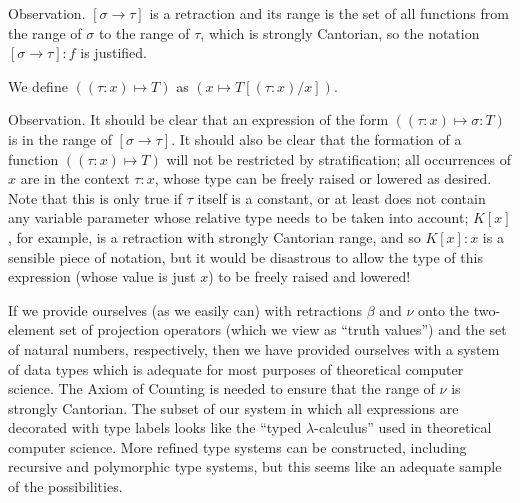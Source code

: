 \begin{ThmEtc}{Observation.}
 $[\sigma \rightarrow \tau]$ is a retraction and
 its range is the set of all functions from the range of
 $\sigma$ to the range of $\tau$, which is strongly Cantorian, so the notation
 $[\sigma \rightarrow \tau]: f$ is justified.
\end{ThmEtc}

\begin{definition}
 We define $((\tau:x) \mapsto T)$ as $(x
 \mapsto T[(\tau:x)/x])$.  
\end{definition}

\begin{ThmEtc}{Observation.}
 It should be clear that an expression of the form $((\tau
 : x) \mapsto \sigma : T)$ is in the range of $[\sigma \rightarrow
 \tau]$.  It should also be clear that the formation of a function
 $((\tau:x) \mapsto T)$ will not be restricted by
 stratification; all 
 occurrences of $x$ are in the context $\tau:x$, whose type can be 
 freely raised or lowered as desired.  Note that this is only true if
 $\tau$ itself is a constant, or at least does not contain any variable
 parameter whose relative type needs to be taken into account; $K[x]$,
 for example, is a retraction with strongly Cantorian range, and so 
 $K[x]:x$ is a sensible piece of notation, but it would be disastrous
 to allow the type of this expression (whose value is just $x$) to be freely
 raised and lowered!
\end{ThmEtc}

If we provide ourselves (as we easily can) with retractions $\beta$
and $\nu$ onto the two-element set of projection operators
(which we view as ``truth values'') and the set of natural
numbers, 
respectively, then we have provided ourselves with a system of data
types which is adequate for most
purposes of theoretical computer 
science.  The Axiom of Counting is needed to ensure
that the range of 
$\nu$ is strongly Cantorian.  The subset of our system in which all
expressions are decorated with type labels looks like the ``typed
$\lambda$-calculus'' used in theoretical computer science.  More
refined type systems can be constructed, including recursive and
polymorphic type systems, but this seems like an adequate sample of
the possibilities.

